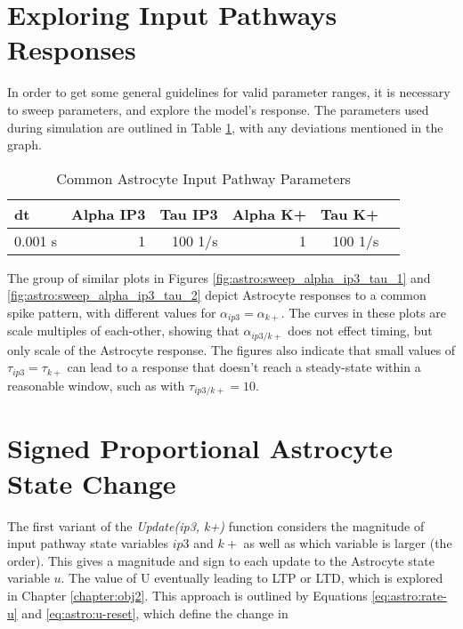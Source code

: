 \section{Exploring Input Pathways Responses}

In order to get some general guidelines for valid parameter ranges, it is
necessary to sweep parameters, and explore the model's response. The parameters
used during simulation are outlined in Table \ref{table:astro_in_path_params},
with any deviations mentioned in the graph.

\begin{table}[!htp] \centering
  \caption{Common Astrocyte Input Pathway Parameters} \label{table:astro_in_path_params}
  \scriptsize
  \begin{tabular}{lrrrrr}\toprule
    dt &Alpha IP3 &Tau IP3 &Alpha K+ &Tau K+ \\\midrule
    0.001 s &1 &100 1/s &1 &100 1/s \\
    \bottomrule
  \end{tabular}
\end{table}



The group of similar plots in Figures \ref{fig:astro:sweep_alpha_ip3_tau_1} and
\ref{fig:astro:sweep_alpha_ip3_tau_2} depict Astrocyte responses to a common
spike pattern, with different values for $\alpha_{ip3}=\alpha_{k+}$. The
curves in these plots are scale multiples of each-other, showing that
$\alpha_{ip3/k+}$ does not effect timing, but only scale of the Astrocyte
response. The figures also indicate that small values of
$\tau_{ip3}=\tau_{k+}$ can lead to a response that doesn't reach a
steady-state within a reasonable window, such as with $\tau_{ip3/k+} = 10$.


\section{Signed Proportional Astrocyte State Change} \label{sec:sign_prop}

The first variant of the \emph{Update(ip3, k+)} function considers the
magnitude of input pathway state variables $ip3$ and $k+$ as well as which
variable is larger (the order). This gives a magnitude and sign to each
update to the Astrocyte state variable $u$. The value of U eventually leading to LTP or
LTD, which is explored in Chapter \ref{chapter:obj2}. This approach is outlined
by Equations \ref{eq:astro:rate-u} and \ref{eq:astro:u-reset}, which define the
change in \ca

